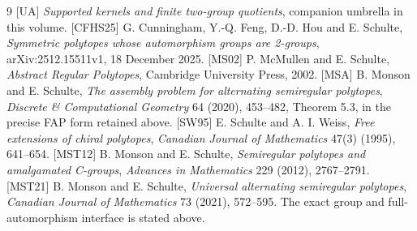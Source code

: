 \begin{thebibliography}{9}
[UA] \emph{Supported kernels and finite two-group quotients},
companion umbrella in this volume.
[CFHS25] G. Cunningham, Y.-Q. Feng, D.-D. Hou and E. Schulte,
\emph{Symmetric polytopes whose automorphism groups are 2-groups},
arXiv:2512.15511v1, 18 December 2025.
[MS02] P. McMullen and E. Schulte,
\emph{Abstract Regular Polytopes}, Cambridge University Press, 2002.
[MSA] B. Monson and E. Schulte,
\emph{The assembly problem for alternating semiregular polytopes},
\emph{Discrete \& Computational Geometry} 64 (2020), 453--482,
Theorem 5.3, in the precise FAP form retained above.
[SW95] E. Schulte and A. I. Weiss,
\emph{Free extensions of chiral polytopes}, \emph{Canadian Journal of
Mathematics} 47(3) (1995), 641--654.
[MST12] B. Monson and E. Schulte,
\emph{Semiregular polytopes and amalgamated C-groups},
\emph{Advances in Mathematics} 229 (2012), 2767--2791.
[MST21] B. Monson and E. Schulte,
\emph{Universal alternating semiregular polytopes},
\emph{Canadian Journal of Mathematics} 73 (2021), 572--595.
The exact group and full-automorphism interface is stated above.
\end{thebibliography}

